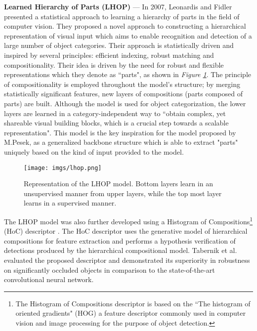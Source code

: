 \documentclass[../main.tex]{subfiles}
\begin{document}
\vspace{0.5cm}

\noindent
\textbf{Learned Hierarchy of Parts (LHOP)} — In 2007, Leonardis and Fidler \cite{Fidler:1} presented a statistical approach to learning a hierarchy of parts in the field of computer vision.  They proposed a novel approach to constructing a hierarchical representation of visual input which aims to enable recognition and detection of a large number of object categories. Their approach is statistically driven and inspired by several principles: efficient indexing, robust matching and compositionality. Their idea is driven by the need for robust and flexible representations which they denote as ``parts", as shown in \textit{Figure \ref{fig:fig1}}. The principle of compositionality is employed throughout the model’s structure; by merging statistically significant features, new layers of compositions (parts composed of parts) are built. Although the model is used for object categorization, the lower layers are learned in a category-independent way to ``obtain complex, yet shareable visual building blocks, which is a crucial step towards a scalable representation". This model is the key inspiration for the model proposed by M.Pesek, as a generalized backbone structure which is able to extract "parts" uniquely based on the kind of input provided to the model.


\begin{figure}[hp]
    \centering
    \texttt{[image: imgs/lhop.png]}
    \caption{Representation of the LHOP model. Bottom layers learn in an unsupervised manner from upper layers, while the top most layer learns in a supervised manner.}
    \label{fig:fig1}
\end{figure}

The LHOP model was also further developed using a Histogram of Compositions\footnote[1]{
The Histogram of Compositions descriptor is based on the ``The histogram of oriented gradients" (HOG) a feature descriptor commonly used in computer vision and image processing for the purpose of object detection.} (HoC) descriptor \cite{Tabernik:1}. The HoC descriptor uses the generative model of hierarchical compositions for feature extraction and performs a hypothesis verification of detections produced by the hierarchical compositional model. Tabernik et al. evaluated the proposed descriptor and demonstrated its superiority in robustness on significantly occluded objects in comparison to the state-of-the-art convolutional neural network.
\end{document}
